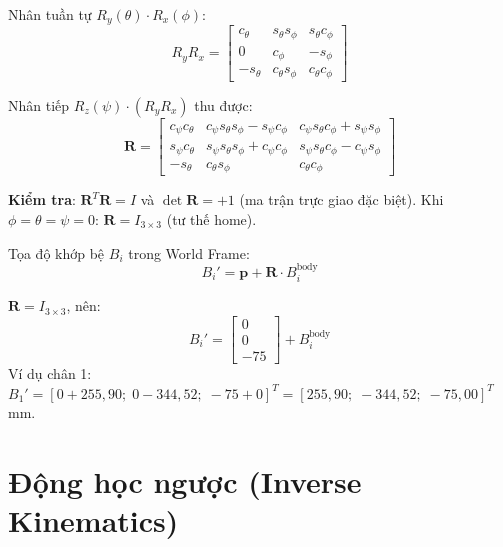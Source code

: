 \documentclass[12pt,a4paper]{article}
\newcommand{\R}{\mathbf{R}}
\newcommand{\pp}{\mathbf{p}}
\begin{document}
Nhân tuần tự $R_y(\theta)\cdot R_x(\phi)$:
\begin{equation}
  R_y R_x = \begin{bmatrix}
    c_\theta & s_\theta s_\phi & s_\theta c_\phi \\
    0        & c_\phi          & -s_\phi         \\
    -s_\theta & c_\theta s_\phi & c_\theta c_\phi
  \end{bmatrix}
\end{equation}

Nhân tiếp $R_z(\psi) \cdot (R_y R_x)$ thu được:
\begin{equation}
\boxed{
  \R = \begin{bmatrix}
    c_\psi c_\theta & c_\psi s_\theta s_\phi - s_\psi c_\phi & c_\psi s_\theta c_\phi + s_\psi s_\phi \\
    s_\psi c_\theta & s_\psi s_\theta s_\phi + c_\psi c_\phi & s_\psi s_\theta c_\phi - c_\psi s_\phi \\
    -s_\theta       & c_\theta s_\phi                        & c_\theta c_\phi
  \end{bmatrix}
}
\label{eq:R_full}
\end{equation}

\textbf{Kiểm tra}: $\R^T\R = I$ và $\det\R = +1$ (ma trận trực giao đặc biệt). Khi
$\phi=\theta=\psi=0$: $\R = I_{3\times3}$ (tư thế home).

Tọa độ khớp bệ $B_i$ trong World Frame:
\begin{equation}
  B_i' = \pp + \R \cdot B_i^{\text{body}}
  \label{eq:Bi_world}
\end{equation}

\begin{numbox}[frametitle={Ví dụ tại home: $\phi{=}\theta{=}\psi{=}0$; $\mathbf{p}{=}[0{,}0{,}-75]^T$ mm}]
$\R = I_{3\times3}$, nên:
\[B_i' = \begin{bmatrix}0\\0\\-75\end{bmatrix} + B_i^{\text{body}}\]
Ví dụ chân 1: $B_1' = [0{+}255{,}90;\; 0{-}344{,}52;\; {-}75{+}0]^T = [255{,}90;\;{-}344{,}52;\;{-}75{,}00]^T$ mm.
\end{numbox}

\section{Động học ngược (Inverse Kinematics)}
\end{document}
